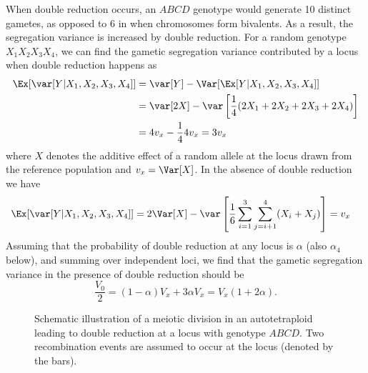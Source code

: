 When double reduction occurs, an \(ABCD\) genotype would generate 10
distinct gametes, as opposed to 6 in when chromosomes form bivalents. As
a result, the segregation variance is increased by double reduction. 
For
a random genotype \(X_1X_2X_3X_4\), we can find the gametic segregation
variance contributed by a locus when double reduction happens as
\begin{align*}
    \Ex[\var[Y|X_1,X_2,X_3,X_4]] &= \var[Y] - \Var[\Ex[Y|X_1,X_2,X_3,X_4]] \\
        &= \var[2X] - \var\left[\frac1 4 (2X_1 + 2X_2 + 2X_3 + 2X_4)\right] \\
        &= 4v_x - \frac{1}{4}4v_x 
        = 3v_x
\end{align*} where \(X\) denotes the additive effect of a random allele
at the locus drawn from the reference population and \(v_x = \Var[X]\).
In the absence of double reduction we have \begin{align*}
    \Ex[\var[Y|X_1,X_2,X_3,X_4]] 
        &= 2\Var[X] - \var\left[\frac1 6 \sum_{i=1}^3 \sum_{j=i+1}^4(X_i+X_j)\right]
        = v_x
\end{align*} Assuming that the probability of double reduction at any
locus is \(\alpha\) (also \(\alpha_4\) below), and summing over
independent loci, we find that the gametic segregation variance in the
presence of double reduction should be \begin{equation}
\frac{V_0}{2} = (1-\alpha)V_x + 3\alpha V_x = V_x(1+2\alpha).
\label{eq:dr}
\end{equation}

\begin{figure}
\begin{center}
\end{center}
\begin{caption}{
Schematic illustration of a meiotic division in an autotetraploid leading to
double reduction at a locus with genotype $ABCD$.
Two recombination events are assumed to occur at the locus (denoted by the
bars).
\label{fig:dr}
}\end{caption}
\end{figure}

